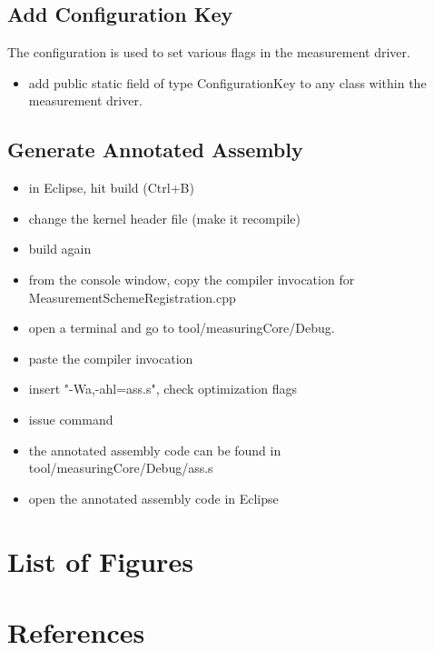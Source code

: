 \documentclass[a4paper,12pt]{article}
\begin{document}
\subsection{Add Configuration Key}
The configuration is used to set various flags in the measurement driver.
\begin{itemize}
\item add public static field of type ConfigurationKey to any class within the
measurement driver.
\end{itemize}

\subsection{Generate Annotated Assembly}
\begin{itemize}
\item in Eclipse, hit build (Ctrl+B)
\item change the kernel header file (make it recompile)
\item build again
\item from the console window, copy the compiler invocation for
MeasurementSchemeRegistration.cpp
\item open a terminal and go to tool/measuringCore/Debug.
\item paste the compiler invocation
\item insert "-Wa,-ahl=ass.s", check optimization flags
\item issue command
\item the annotated assembly code can be found in tool/measuringCore/Debug/ass.s
\item open the annotated assembly code in Eclipse
\end{itemize}

\section{List of Figures}
\renewcommand{\listfigurename}{}
\vskip -1cm
\listoffigures

\renewcommand\refname{\vskip -1cm}
\section{References}


\end{document}
